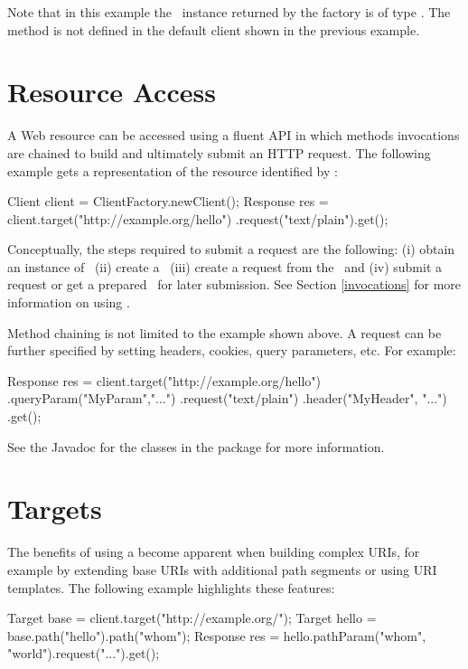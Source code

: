 Note that in this example the \Client\ instance returned by the factory is of type . The method  is not defined in the default client shown in the previous example.

\section{Resource Access}
\label{resource_access}

A Web resource can be accessed using a fluent API in which methods invocations are chained to build and ultimately submit an HTTP request. The following example gets a  representation of the resource identified by :

\begin{listing}{1}
Client client = ClientFactory.newClient();
Response res = client.target("http://example.org/hello")
    .request("text/plain").get();
\end{listing}

Conceptually, the steps required to submit a request are the following: (i) obtain an instance of \Client\ (ii) create a \Target\ (iii) create a request from the \Target\ and (iv) submit a request or get a prepared \Invocation\ for later submission. See Section \ref{invocations} for more information on using \Invocation.

Method chaining is not limited to the example shown above. A request can be further specified by setting headers, cookies, query parameters, etc. For example:

\begin{listing}{1}
Response res = client.target("http://example.org/hello")
    .queryParam("MyParam","...")
    .request("text/plain")
    .header("MyHeader", "...")
    .get();
\end{listing}

See the Javadoc for the classes in the  package for more information.

\section{Targets}

The benefits of using a  become apparent when building complex URIs, for example by extending base URIs with additional path segments or using URI templates. The following example highlights these features:

\begin{listing}{1}
Target base = client.target("http://example.org/");
Target hello = base.path("hello").path("{whom}");   
Response res = hello.pathParam("whom", "world").request("...").get();
\end{listing}

